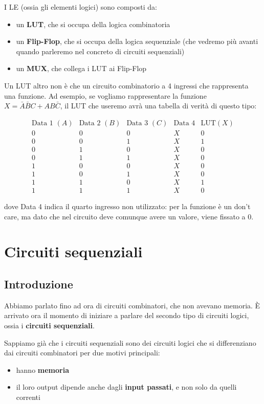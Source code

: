 \documentclass[11pt, a4paper, titlepage, oneside]{scrbook}
\begin{document}
I LE (ossia gli elementi logici) sono composti da:
\begin{itemize}
    \item un \textbf{LUT}, che si occupa della logica combinatoria
    \item un \textbf{Flip-Flop}, che si occupa della logica sequenziale (che vedremo più avanti quando parleremo nel concreto di circuiti sequenziali)
    \item un \textbf{MUX}, che collega i LUT ai Flip-Flop
\end{itemize}

Un LUT altro non è che un circuito combinatorio a 4 ingressi che rappresenta una funzione. Ad esempio, se vogliamo rappresentare la funzione $X = \bar{A} \bar{B} C + AB \bar{C}$, il LUT che useremo avrà una tabella di verità di questo tipo:

\[
\begin{array}{cccc|c}
\text{Data 1 } (A) & \text{Data 2 } (B) & \text{Data 3 } (C) & \text{Data 4} & \text{LUT} (X) \\
\hline
0 & 0 & 0 & X & 0 \\
0 & 0 & 1 & X & 1 \\
0 & 1 & 0 & X & 0 \\
0 & 1 & 1 & X & 0 \\
1 & 0 & 0 & X & 0 \\
1 & 0 & 1 & X & 0 \\
1 & 1 & 0 & X & 1 \\
1 & 1 & 1 & X & 0
\end{array}
\]

dove Data 4 indica il quarto ingresso non utilizzato: per la funzione è un don't care, ma dato che nel circuito deve comunque avere un valore, viene fissato a 0.

\chapter{Circuiti sequenziali}

\section{Introduzione}

Abbiamo parlato fino ad ora di circuiti combinatori, che non avevano memoria. È arrivato ora il momento di iniziare a parlare del secondo tipo di circuiti logici, ossia i \textbf{circuiti sequenziali}.

Sappiamo già che i circuiti sequenziali sono dei circuiti logici che si differenziano dai circuiti combinatori per due motivi principali:
\begin{itemize}
    \item hanno \textbf{memoria}
    \item il loro output dipende anche dagli \textbf{input passati}, e non solo da quelli correnti
\end{itemize}
\end{document}
